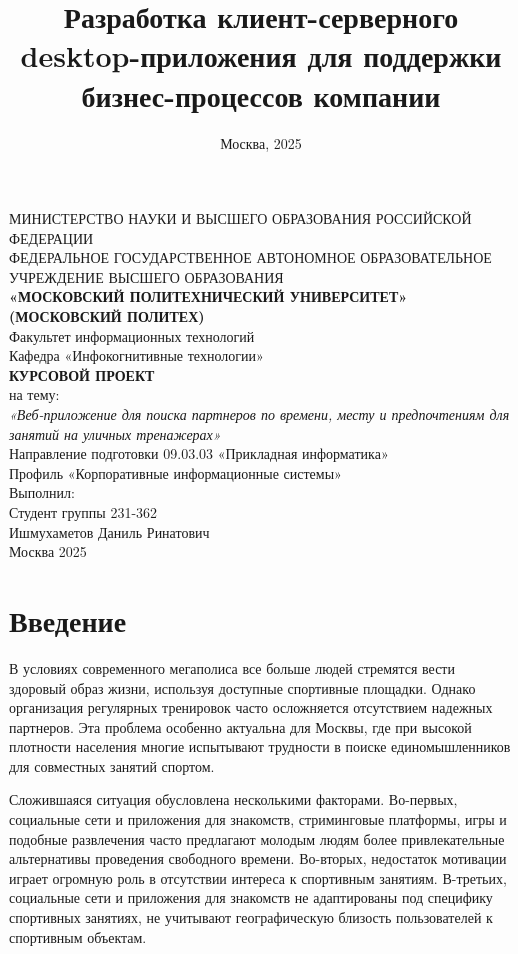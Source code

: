\documentclass[14pt]{article}
\title{Разработка клиент-серверного desktop-приложения для поддержки бизнес-процессов компании}
\author{}
\date{Москва, 2025}
\begin{document}
\onehalfspacing

\begin{center}
	МИНИСТЕРСТВО НАУКИ И ВЫСШЕГО ОБРАЗОВАНИЯ РОССИЙСКОЙ ФЕДЕРАЦИИ \\[0.2cm]
	ФЕДЕРАЛЬНОЕ ГОСУДАРСТВЕННОЕ АВТОНОМНОЕ ОБРАЗОВАТЕЛЬНОЕ УЧРЕЖДЕНИЕ ВЫСШЕГО ОБРАЗОВАНИЯ \\[0.2cm]
	\textbf{«МОСКОВСКИЙ ПОЛИТЕХНИЧЕСКИЙ УНИВЕРСИТЕТ» (МОСКОВСКИЙ ПОЛИТЕХ)} \\[1cm]
	Факультет информационных технологий \\[0.2cm]
	Кафедра «Инфокогнитивные технологии» \\[4 cm]

	\textbf{КУРСОВОЙ ПРОЕКТ} \\[0.2cm]
	на тему: \\
	\textit{«Веб-приложение для поиска партнеров по времени, месту и предпочтениям для занятий на уличных тренажерах»} \\[0.5cm]

	Направление подготовки 09.03.03 «Прикладная информатика» \\
	Профиль «Корпоративные информационные системы» \\
    
	 \vfill
     \hfill Выполнил: \\[0.2cm] 
     \hfill Студент группы 231-362 \\ 
     \hfill Ишмухаметов Даниль Ринатович \\ 
     \vfill
	Москва 2025
\end{center}

\newpage

\fontsize{14pt}{18pt}\selectfont

\section*{ Введение}
В условиях современного мегаполиса все больше людей стремятся вести здоровый образ жизни, используя доступные спортивные площадки.
Однако организация регулярных тренировок часто осложняется отсутствием надежных партнеров. Эта проблема особенно актуальна для Москвы,
где при высокой плотности населения многие испытывают трудности в поиске единомышленников для совместных занятий спортом.

Сложившаяся ситуация обусловлена несколькими факторами. Во-первых, социальные сети и приложения для знакомств, стриминговые платформы,
игры и подобные развлечения часто предлагают молодым людям более привлекательные альтернативы проведения свободного времени. Во-вторых,
недостаток мотивации играет огромную роль в отсутствии интереса к спортивным занятиям. В-третьих, социальные сети и приложения для знакомств не
адаптированы под специфику спортивных занятиях, не учитывают географическую близость пользователей к спортивным объектам.
\end{document}
